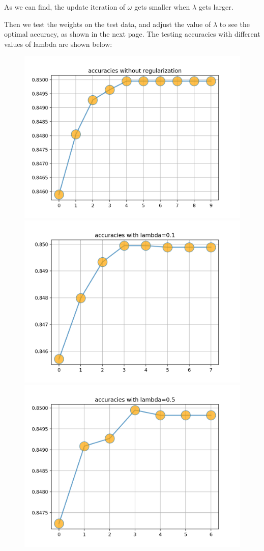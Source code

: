 \documentclass[12pt]{article}
\begin{document}
As we can find, the update iteration of $\omega$ gets smaller when $\lambda$ gets larger. 
\par
Then we test the weights on the test data, and adjust the value of $\lambda$ to see the optimal accuracy, as shown in the next page.
\newpage
The testing accuracies with different values of lambda are shown below:
\begin{figure}[ht]
\centering
\includegraphics[scale=0.47]{1.png}
\includegraphics[scale=0.47]{2.png}
\includegraphics[scale=0.47]{3.png}

\end{figure}
\end{document}
